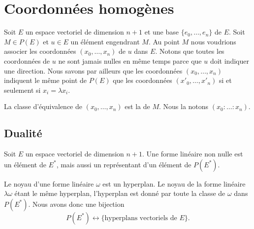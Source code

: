 \section{Coordonnées homogènes}

Soit \( E\) un espace vectoriel de dimension \( n+1\) et une base \( \{ e_0,\ldots, e_n \}\) de \( E\). Soit \( M\in P(E)\) et \( u\in E\) un élément engendrant \( M\). Au point \( M\) nous voudrions associer les coordonnées \( (x_0,\ldots, x_n)\) de \( u\) dans \( E\). Notons que toutes les coordonnées de \( u\) ne sont jamais nulles en même temps parce que \( u\) doit indiquer une direction. Nous savons par ailleurs que les coordonnées \( (x_0,\ldots, x_n)\) indiquent le même point de \( P(E)\) que les coordonnées \( (x'_0,\ldots, x'_n)\) si et seulement si \( x_i=\lambda x_i\).

\begin{definition}
    La classe d'équivalence de \( (x_0,\ldots, x_n)\) est la  de \( M\). Nous la notons \( (x_0:\ldots :x_n)\).
\end{definition}


\subsection{Dualité}

Soit \( E\) un espace vectoriel de dimension \( n+1\). Une forme linéaire non nulle est un élément de \( E^*\), mais aussi un représentant d'un élément de \( P(E^*)\).

Le noyau d'une forme linéaire \( \omega\) est un hyperplan. Le noyau de la forme linéaire \( \lambda\omega\) étant le même hyperplan, l'hyperplan est donné par toute la classe de \( \omega\) dans \( P(E^*)\). Nous avons donc une bijection
\begin{equation}
    P(E^*)\leftrightarrow \{ \text{hyperplans vectoriels de } E \}.
\end{equation}

